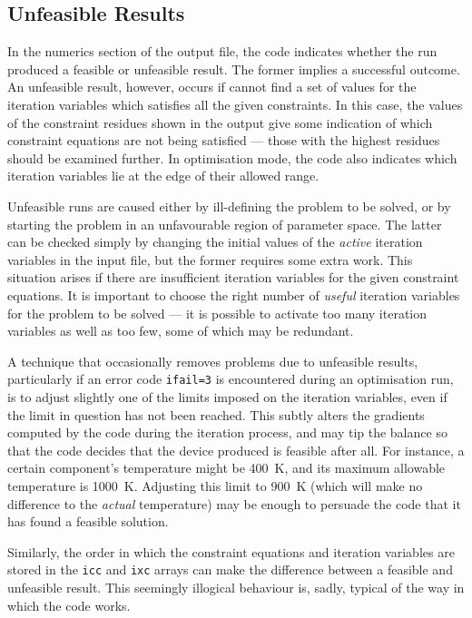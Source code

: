 \subsection{Unfeasible Results}

In the numerics section of the output file, the code indicates whether the run
produced a feasible or unfeasible result. The former implies a successful
outcome. An unfeasible result, however, occurs if \PS cannot find a set of
values for the iteration variables which satisfies all the given
constraints. In this case, the values of the constraint residues shown in the
output give some indication of which constraint equations are not being
satisfied --- those with the highest residues should be examined further. In
optimisation mode, the code also indicates which iteration variables lie at
the edge of their allowed range.

Unfeasible runs are caused either by ill-defining the problem to be solved, or
by starting the problem in an unfavourable region of parameter space. The
latter can be checked simply by changing the initial values of the {\em
active}\/ iteration variables in the input file, but the former requires some
extra work. This situation arises if there are insufficient iteration
variables for the given constraint equations. It is important to choose the
right number of {\em useful}\/ iteration variables for the problem to be
solved --- it is possible to activate too many iteration variables as well as
too few, some of which may be redundant.

A technique that occasionally removes problems due to unfeasible results,
particularly if an error code {\tt ifail=3} is encountered during an
optimisation run, is to adjust slightly one of the limits imposed on the
iteration variables, even if the limit in question has not been reached. This
subtly alters the gradients computed by the code during the iteration process,
and may tip the balance so that the code decides that the device produced is
feasible after all. For instance, a certain component's temperature might be
400~K, and its maximum allowable temperature is 1000~K\@. Adjusting this limit
to 900~K (which will make no difference to the {\em actual}\/ temperature) may
be enough to persuade the code that it has found a feasible solution.

Similarly, the order in which the constraint equations and iteration variables
are stored in the {\tt icc} and {\tt ixc} arrays can make the difference
between a feasible and unfeasible result. This seemingly illogical behaviour
is, sadly, typical of the way in which the code works.

